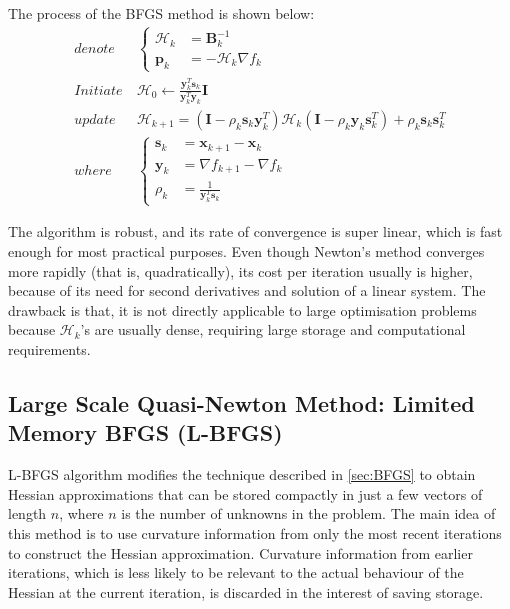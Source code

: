 The process of the BFGS method is shown below:
\begin{align}
  denote   & \                       \left\{
  \begin{array}{ll}
    \mathcal{H}_k & = \textbf{B}_k^{-1}          \\
    \textbf{p}_k & = -\mathcal{H}_k \nabla f_{k}
  \end{array}
  \right.                                                                                                                                                                                                        \\
  Initiate & \ \mathcal{H}_0     \leftarrow \frac{\textbf{y}_k^T\textbf{s}_k}{\textbf{y}_k^T\textbf{y}_k}\textbf{I}                                                           \label{eq:BFGS_initiate_H_0}        \\
  update   & \ \mathcal{H}_{k+1}  = (\textbf{I} - \rho_k\textbf{s}_k\textbf{y}_k^T) \mathcal{H}_{k} (\textbf{I} - \rho_k\textbf{y}_k\textbf{s}_k^T) +\rho_k\textbf{s}_k\textbf{s}_k^T \label{eq:BFGS_update_H_k+1} \\
  where    & \                        \left\{
  \begin{array}{ll}
    \textbf{s}_k & = \textbf{x}_{k+1} - \textbf{x}_{k}                               \\
    \textbf{y}_k & = \nabla f_{k+1} - \nabla f_{k}                                   \\
    \rho_k       & = \frac{1}{\textbf{y}_k^T\textbf{s}_k} \label{eq:BFGS_calc_rho_k}
  \end{array}
  \right.
\end{align}

The algorithm is robust, and its rate of convergence is super linear, which is fast enough for most practical purposes. Even though Newton's method converges more rapidly (that is, quadratically), its cost per iteration usually is higher, because of its need for second derivatives and solution of a linear system. The drawback is that, it is not directly applicable to large optimisation problems because $\mathcal{H}_k$'s are usually dense, requiring large storage and computational requirements. \cite{Nocedal2006}


\subsection{Large Scale Quasi-Newton Method: Limited Memory BFGS (L-BFGS)}\label{sec:L-BFGS}
L-BFGS algorithm \cite{Liu1989} modifies the technique described in \cref{sec:BFGS} to obtain Hessian approximations that can be stored compactly in just a few vectors of length $n$, where $n$ is the number of unknowns in the problem. The main idea of this method is to use curvature information from only the most recent iterations to construct the Hessian approximation. Curvature information from earlier iterations, which is less likely to be relevant to the actual behaviour of the Hessian at the current iteration, is discarded in the interest of saving storage. \cite{Nocedal2006}

